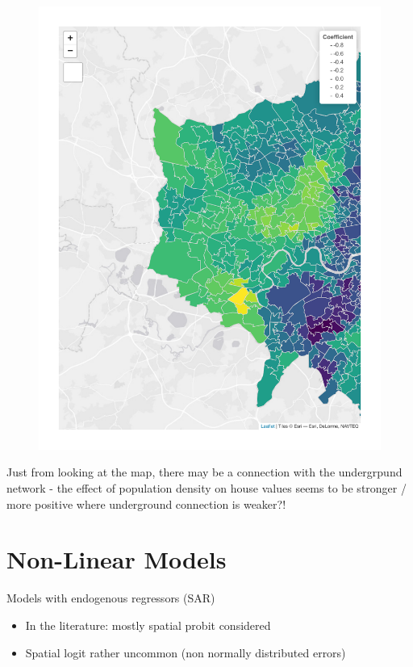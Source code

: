 \documentclass[
  letterpaper,
  DIV=11,
  numbers=noendperiod]{scrreprt}
\begin{document}
\begin{figure}[H]

{\centering \includegraphics{10_other_files/figure-pdf/unnamed-chunk-5-1.pdf}

}

\end{figure}

Just from looking at the map, there may be a connection with the
undergrpund network - the effect of population density on house values
seems to be stronger / more positive where underground connection is
weaker?!

\hypertarget{non-linear-models}{%
\section{Non-Linear Models}\label{non-linear-models}}

Models with endogenous regressors (SAR)

\begin{itemize}
\item
  In the literature: mostly spatial probit considered
\item
  Spatial logit rather uncommon (non normally distributed errors)
\end{itemize}
\end{document}

